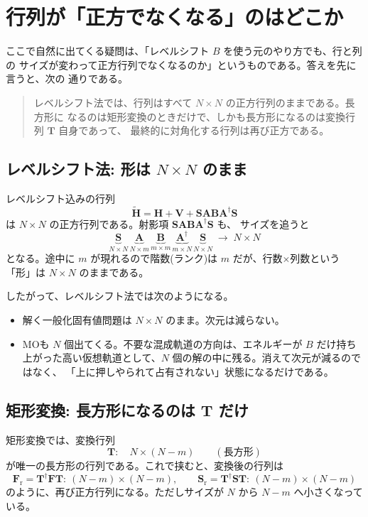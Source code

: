 \documentclass[uplatex,dvipdfmx,11pt]{jsarticle}
\newcommand{\Hcore}{\mathbf H}
\newcommand{\Venv}{\mathbf V}
\newcommand{\Smat}{\mathbf S}
\newcommand{\Amat}{\mathbf A}
\newcommand{\Bmat}{\mathbf B}
\newcommand{\Tmat}{\mathbf T}
\newcommand{\Fmat}{\mathbf F}
\newcommand{\Fr}{\mathbf F_{\mathrm r}}
\newcommand{\Sr}{\mathbf S_{\mathrm r}}
\begin{document}
\section{行列が「正方でなくなる」のはどこか}

ここで自然に出てくる疑問は、「レベルシフト \(B\) を使う元のやり方でも、行と列の
サイズが変わって正方行列でなくなるのか」というものである。答えを先に言うと、次の
通りである。

\begin{quote}
レベルシフト法では、行列はすべて \(N\times N\) の正方行列のままである。長方形に
なるのは矩形変換のときだけで、しかも長方形になるのは変換行列 \(\Tmat\) 自身であって、
最終的に対角化する行列は再び正方である。
\end{quote}

\subsection{レベルシフト法: 形は \(N\times N\) のまま}

レベルシフト込みの行列
\[
  \widetilde{\Hcore}
  =
  \Hcore+\Venv+\Smat\Amat\Bmat\Amat^\dagger\Smat
\]
は \(N\times N\) の正方行列である。射影項 \(\Smat\Amat\Bmat\Amat^\dagger\Smat\) も、
サイズを追うと
\[
  \underbrace{\Smat}_{N\times N}\,
  \underbrace{\Amat}_{N\times m}\,
  \underbrace{\Bmat}_{m\times m}\,
  \underbrace{\Amat^\dagger}_{m\times N}\,
  \underbrace{\Smat}_{N\times N}
  \;\longrightarrow\; N\times N
\]
となる。途中に \(m\) が現れるので階数(ランク)は \(m\) だが、行数\(\times\)列数という
「形」は \(N\times N\) のままである。

したがって、レベルシフト法では次のようになる。

\begin{itemize}
\item 解く一般化固有値問題は \(N\times N\) のまま。次元は減らない。
\item MOも \(N\) 個出てくる。不要な混成軌道の方向は、エネルギーが \(B\) だけ持ち
      上がった高い仮想軌道として、\(N\) 個の解の中に残る。消えて次元が減るのではなく、
      「上に押しやられて占有されない」状態になるだけである。
\end{itemize}

\subsection{矩形変換: 長方形になるのは \(\Tmat\) だけ}

矩形変換では、変換行列
\[
  \Tmat:\quad N\times(N-m)\qquad(\text{長方形})
\]
が唯一の長方形の行列である。これで挟むと、変換後の行列は
\[
  \Fr=\Tmat^\dagger\Fmat\Tmat:\ (N-m)\times(N-m),\qquad
  \Sr=\Tmat^\dagger\Smat\Tmat:\ (N-m)\times(N-m)
\]
のように、再び正方行列になる。ただしサイズが \(N\) から \(N-m\) へ小さくなっている。
\end{document}
